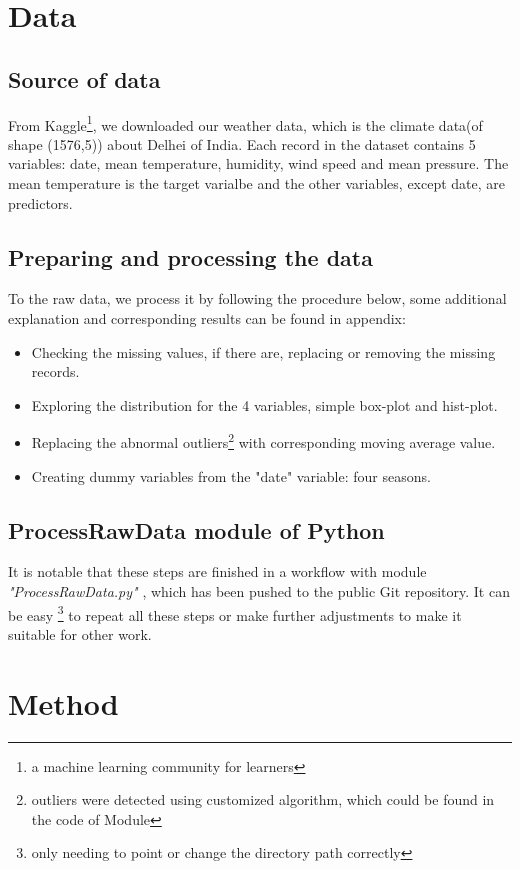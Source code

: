 \documentclass[12pt]{article}
\begin{document}
\section{Data}
\subsection{Source of data}
From Kaggle\footnote{a machine learning community for learners},  
we downloaded our weather data, which is 
the climate data(of shape (1576,5)) about Delhei of India. 
Each record in the dataset contains 5 variables: date, mean temperature, 
humidity, wind speed and mean pressure. The mean temperature is the target varialbe and 
the other variables, except date, are predictors.

\subsection{Preparing and processing the data}
To the raw data, we process it by following the procedure below,
some additional explanation and corresponding results can be found in appendix:
\begin{itemize}
    \item Checking the missing values, if there are, replacing or removing the missing records.
    \item Exploring the distribution for the 4 variables, simple box-plot and hist-plot.
    \item Replacing the abnormal outliers\footnote{outliers were detected using customized algorithm, which could be 
    found in the code of Module} 
    with corresponding moving average value.
    \item Creating dummy variables from the "date" variable: four seasons.   
\end{itemize}

\subsection{ProcessRawData module of Python}
It is notable that these steps are finished in a workflow with module \textit{"ProcessRawData.py"}
\cite{financialriskforecasting},
which has been pushed to the public Git repository. It can be easy
\footnote{only needing to point or change the directory path correctly} 
to repeat all these steps or make 
further adjustments to make it suitable for other work. 

\section{Method}
\end{document}
